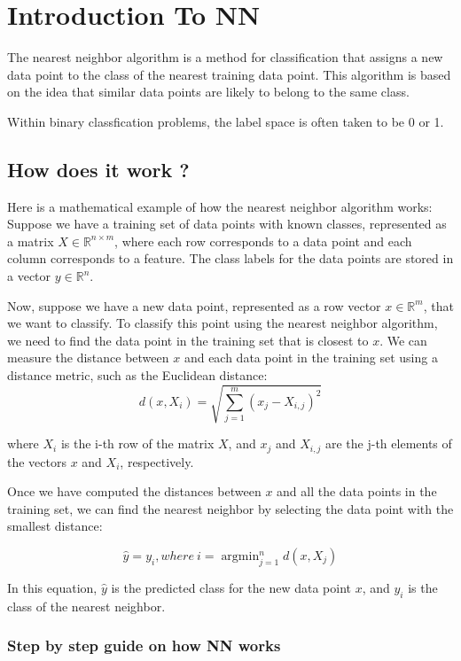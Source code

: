 \section{Introduction To NN}
\begin{definition}
	The nearest neighbor algorithm is a method for classification that assigns a new data point to the class of the nearest training data point. This algorithm is based on the idea that similar data points are likely to belong to the same class.
\end{definition}

Within binary classfication problems, the label space is often taken to be 0 or 1.

\subsection{How does it work ? }
Here is a mathematical example of how the nearest neighbor algorithm works:
Suppose we have a training set of data points with known classes, represented as a matrix $X \in \mathbb{R}^{n \times m}$, where each row corresponds to a data point and each column corresponds to a feature. The class labels for the data points are stored in a vector $y \in \mathbb{R}^n$.

Now, suppose we have a new data point, represented as a row vector $x \in \mathbb{R}^m$, that we want to classify. To classify this point using the nearest neighbor algorithm, we need to find the data point in the training set that is closest to $x$. We can measure the distance between $x$ and each data point in the training set using a distance metric, such as the Euclidean distance:
$$d(x, X_i) = \sqrt{\sum_{j=1}^m (x_j - X_{i,j})^2}$$

where $X_i$ is the i-th row of the matrix $X$, and $x_j$ and $X_{i,j}$ are the j-th elements of the vectors $x$ and $X_i$, respectively.

Once we have computed the distances between $x$ and all the data points in the training set, we can find the nearest neighbor by selecting the data point with the smallest distance:

$$\hat{y} = y_i, where\ i = \operatorname{argmin}_{j=1}^n d(x, X_j)$$

In this equation, $\hat{y}$ is the predicted class for the new data point $x$, and $y_i$ is the class of the nearest neighbor.

\subsubsection{Step by step guide on how NN works}


